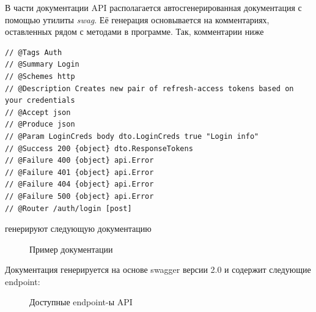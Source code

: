 \documentclass[diploma]{SCWorks}
\begin{document}
В части документации API располагается автосгенерированная документация с 
помощью утилиты \textit{swag}. Её генерация основывается на комментариях, 
оставленных рядом с методами в программе. Так, комментарии ниже
\begin{verbatim}
// @Tags Auth
// @Summary Login
// @Schemes http
// @Description Creates new pair of refresh-access tokens based on your credentials
// @Accept json
// @Produce json
// @Param LoginCreds body dto.LoginCreds true "Login info"
// @Success 200 {object} dto.ResponseTokens
// @Failure 400 {object} api.Error
// @Failure 401 {object} api.Error
// @Failure 404 {object} api.Error
// @Failure 500 {object} api.Error
// @Router /auth/login [post]
\end{verbatim}
генерируют следующую документацию
\begin{figure}[H]
	\caption{Пример документации}
	\label{pic:doc_example}
\end{figure}

Документация генерируется на основе swagger версии 2.0 и содержит следующие 
endpoint:

\begin{figure}[H]
	\caption{Доступные endpoint-ы API}
	\label{pic:doc_endpoints}
\end{figure}
\end{document}
